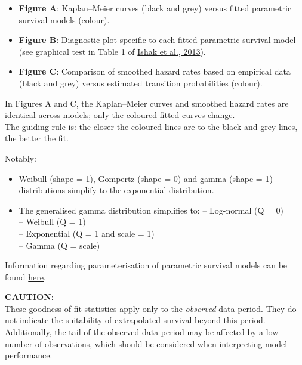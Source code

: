 \documentclass[
]{article}
\providecommand{\tightlist}{%
  \setlength{\itemsep}{0pt}\setlength{\parskip}{0pt}}
\begin{document}
\begin{itemize}
\tightlist
\item
  \textbf{Figure A}: Kaplan--Meier curves (black and grey) versus fitted
  parametric survival models (colour).\\
\item
  \textbf{Figure B}: Diagnostic plot specific to each fitted parametric
  survival model (see graphical test in Table 1 of
  \href{https://doi.org/10.1007/s40273-013-0064-3}{Ishak et al., 2013}).
\item
  \textbf{Figure C}: Comparison of smoothed hazard rates based on
  empirical data (black and grey) versus estimated transition
  probabilities (colour).
\end{itemize}

In Figures A and C, the Kaplan--Meier curves and smoothed hazard rates
are identical across models; only the coloured fitted curves change.\\
The guiding rule is: the closer the coloured lines are to the black and
grey lines, the better the fit.

Notably:

\begin{itemize}
\tightlist
\item
  Weibull (shape = 1), Gompertz (shape = 0) and gamma (shape = 1)
  distributions simplify to the exponential distribution.\\
\item
  The generalised gamma distribution simplifies to: -- Log-normal (Q =
  0)\\
  -- Weibull (Q = 1)\\
  -- Exponential (Q = 1 and scale = 1)\\
  -- Gamma (Q = scale)
\end{itemize}

Information regarding parameterisation of parametric survival models can
be found
\href{https://devinincerti.com/code/survival-distributions.html}{here}.

\textbf{CAUTION}:\\
These goodness-of-fit statistics apply only to the \emph{observed} data
period. They do not indicate the suitability of extrapolated survival
beyond this period. Additionally, the tail of the observed data period
may be affected by a low number of observations, which should be
considered when interpreting model performance.

\clearpage
\end{document}
